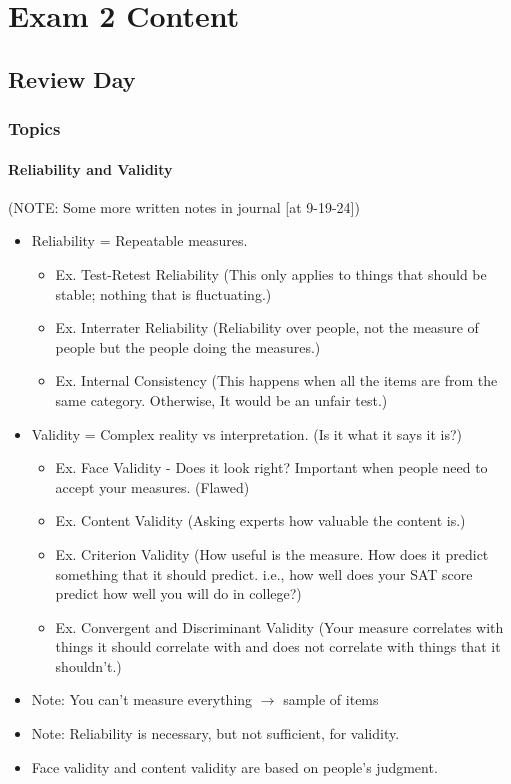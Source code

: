 \documentclass{report}
\begin{document}
\chapter{Exam 2 Content}

\section{Review Day}

\subsection{Topics}

\subsubsection{Reliability and Validity}
(NOTE: Some more written notes in journal [at 9-19-24])
\begin{itemize}
    \item Reliability = Repeatable measures.
        \begin{itemize}
            \item Ex. Test-Retest Reliability (This only applies to things that should be stable; nothing that is fluctuating.) 
            \item Ex. Interrater Reliability (Reliability over people, not the measure of people but the people doing the measures.) 
            \item Ex. Internal Consistency (This happens when all the items are from the same category. Otherwise, It would be an unfair test.)
        \end{itemize}
    \item Validity = Complex reality vs interpretation. (Is it what it says it is?) 
        \begin{itemize}
            \item Ex. Face Validity - Does it look right? Important when people need to accept your measures. (Flawed)
            \item Ex. Content Validity (Asking experts how valuable the content is.)  
            \item Ex. Criterion Validity (How useful is the measure. How does it predict something that it should predict. i.e., how well does your SAT score predict how well you will do in college?) 
            \item Ex. Convergent and Discriminant Validity (Your measure correlates with things it should correlate with and does not correlate with things that it shouldn't.) 
        \end{itemize}
    \item Note: You can't measure everything $\rightarrow$ sample of items  
    \item Note: Reliability is necessary, but not sufficient, for validity.    
    \item Face validity and content validity are based on people's judgment. 
\end{itemize}
\end{document}
